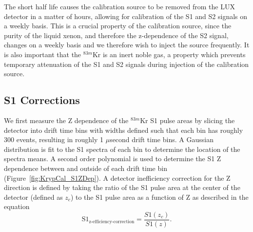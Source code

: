 The short half life causes the calibration source to be removed from the LUX detector in a matter of hours, allowing for calibration of the S1 and S2 signals on a weekly basis.  This is a crucial property of the calibration source, since the purity of the liquid xenon, and therefore the z-dependence of the S2 signal, changes on a weekly basis and we therefore wish to inject the source frequently.  It is also important that the $^{83m}$Kr is an inert noble gas, a property which prevents temporary attenuation of the S1 and S2 signals during injection of the calibration source. 


\subsection{S1 Corrections}\label{S1SignalCorr}

We first measure the Z dependence of the $^{83m}$Kr S1 pulse areas by slicing the detector into drift time bins with widths defined such that each bin has roughly 300 events, resulting in roughly 1 $\mu$second drift time bins.  A Gaussian distribution is fit to the S1 spectra of each bin to determine the location of the spectra means. A second order polynomial is used to determine the S1 Z dependence between and outside of each drift time bin (Figure~\ref{fig:KrypCal_S1ZDep}). A detector inefficiency correction for the Z direction is defined by taking the ratio of the S1  pulse area at the center of the detector (defined as $z_c$) to the S1 pulse area as a function of Z as described in the equation
\begin{equation}
\mbox{S}1_{\mbox{z-efficiency-correction}} = \frac{S1(z_c)}{S1(z)}.
\end{equation} 


